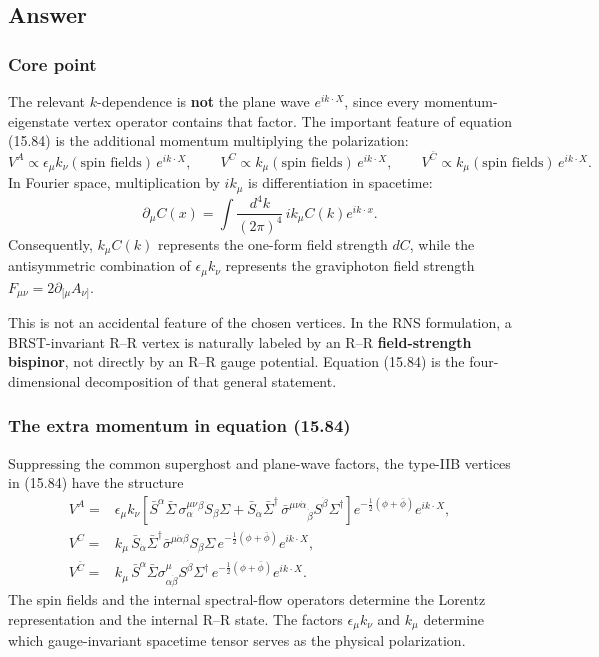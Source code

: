 \documentclass[
  10pt,
  a4paper,
  openany]{book}
\begin{document}
\subsection{Answer}\label{answer-28}

\subsubsection{Core point}\label{core-point-28}

The relevant \(k\)-dependence is \textbf{not} the plane wave
\(e^{ik\cdot X}\), since every momentum-eigenstate vertex operator
contains that factor. The important feature of equation (15.84) is the
additional momentum multiplying the polarization: \[
V^A\propto\epsilon_\mu k_\nu(\text{spin fields})\,e^{ik\cdot X},
\qquad
V^C\propto k_\mu(\text{spin fields})\,e^{ik\cdot X},
\qquad
V^{\bar C}\propto k_\mu(\text{spin fields})\,e^{ik\cdot X}.
\] In Fourier space, multiplication by \(ik_\mu\) is differentiation in
spacetime: \[
\partial_\mu C(x)
=
\int\frac{d^4k}{(2\pi)^4}\,
ik_\mu C(k)e^{ik\cdot x}.
\] Consequently, \(k_\mu C(k)\) represents the one-form field strength
\(dC\), while the antisymmetric combination of \(\epsilon_\mu k_\nu\)
represents the graviphoton field strength
\(F_{\mu\nu}=2\partial_{[\mu}A_{\nu]}\).

This is not an accidental feature of the chosen vertices. In the RNS
formulation, a BRST-invariant R--R vertex is naturally labeled by an
R--R \textbf{field-strength bispinor}, not directly by an R--R gauge
potential. Equation (15.84) is the four-dimensional decomposition of
that general statement.

\subsubsection{The extra momentum in equation
(15.84)}\label{the-extra-momentum-in-equation-15.84}

Suppressing the common superghost and plane-wave factors, the type-IIB
vertices in (15.84) have the structure \[
\begin{aligned}
V^A
={}&
\epsilon_\mu k_\nu
\left[
\bar S^\alpha\bar\Sigma\,
\sigma^{\mu\nu}_{\alpha}{}^\beta
S_\beta\Sigma
+
\bar S_{\dot\alpha}\bar\Sigma^\dagger\,
\bar\sigma^{\mu\nu\dot\alpha}{}_{\dot\beta}
S^{\dot\beta}\Sigma^\dagger
\right]
e^{-\frac12(\phi+\bar\phi)}e^{ik\cdot X},
\\
V^C
={}&
k_\mu\,
\bar S_{\dot\alpha}\bar\Sigma^\dagger
\bar\sigma^{\mu\dot\alpha\beta}
S_\beta\Sigma\,
e^{-\frac12(\phi+\bar\phi)}e^{ik\cdot X},
\\
V^{\bar C}
={}&
k_\mu\,
\bar S^\alpha\bar\Sigma
\sigma^\mu_{\alpha\dot\beta}
S^{\dot\beta}\Sigma^\dagger\,
e^{-\frac12(\phi+\bar\phi)}e^{ik\cdot X}.
\end{aligned}
\] The spin fields and the internal spectral-flow operators determine
the Lorentz representation and the internal R--R state. The factors
\(\epsilon_\mu k_\nu\) and \(k_\mu\) determine which gauge-invariant
spacetime tensor serves as the physical polarization.
\end{document}
